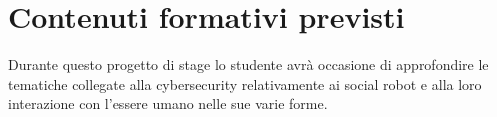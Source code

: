 \section*{Contenuti formativi previsti}
Durante questo progetto di stage lo studente avrà occasione di approfondire le tematiche collegate alla cybersecurity relativamente ai social robot e alla loro interazione con l'essere umano nelle sue varie forme.
\newpage